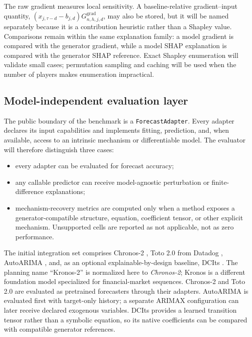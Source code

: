 The raw gradient measures local sensitivity. A baseline-relative
gradient--input quantity,
$(x_{j,\tau-d}-b_{j,d})G^{\mathrm{grad}}_{n,h,j,d}$, may also be stored, but it
will be named separately because it is a contribution heuristic rather than a
Shapley value. Comparisons remain within the same explanation family: a model
gradient is compared with the generator gradient, while a model SHAP
explanation is compared with the generator SHAP reference. Exact Shapley
enumeration will validate small cases; permutation sampling and caching will be
used when the number of players makes enumeration impractical.

\subsection{Model-independent evaluation layer}

The public boundary of the benchmark is a \texttt{ForecastAdapter}. Every
adapter declares its input capabilities and implements fitting, prediction,
and, when available, access to an intrinsic mechanism or differentiable model.
The evaluator will therefore distinguish three cases:

\begin{itemize}
    \item every adapter can be evaluated for forecast accuracy;
    \item any callable predictor can receive model-agnostic perturbation or
    finite-difference explanations;
    \item mechanism-recovery metrics are computed only when a method exposes a
    generator-compatible structure, equation, coefficient tensor, or other
    explicit mechanism. Unsupported cells are reported as not applicable, not
    as zero performance.
\end{itemize}

The initial integration set comprises Chronos-2
\citep{ansari2025chronos2}, Toto 2.0 from Datadog
\citep{khwaja2026toto2}, AutoARIMA \citep{hyndman2008auto}, and, as an
optional explainable-by-design baseline, DCIts \citep{baric2026dcits}. The
planning name ``Kronos-2'' is normalized here to \emph{Chronos-2}; Kronos is a
different foundation model specialized for financial-market sequences.
Chronos-2 and Toto 2.0 are evaluated as pretrained forecasters through their
adapters. AutoARIMA is evaluated first with target-only history; a separate
ARIMAX configuration can later receive declared exogenous variables. DCIts
provides a learned transition tensor rather than a symbolic equation, so its
native coefficients can be compared with compatible generator references.

